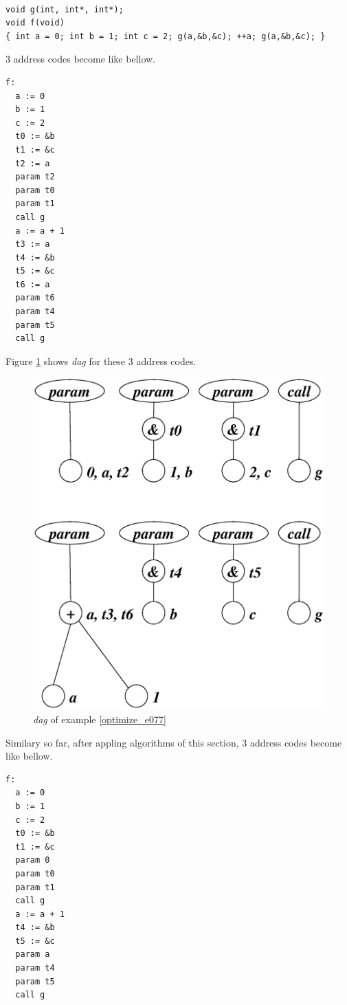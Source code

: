 \begin{Example}
\label{optimize_e077}
\begin{verbatim}

void g(int, int*, int*);
void f(void)
{ int a = 0; int b = 1; int c = 2; g(a,&b,&c); ++a; g(a,&b,&c); }
\end{verbatim}
3 address codes become like bellow.
\begin{verbatim}
f:
  a := 0
  b := 1
  c := 2
  t0 := &b
  t1 := &c
  t2 := a
  param t2
  param t0
  param t1
  call g
  a := a + 1
  t3 := a
  t4 := &b
  t5 := &c
  t6 := a
  param t6
  param t4
  param t5
  call g
\end{verbatim}
Figure \ref{optimize_e078} shows {\em dag} for these 3 address codes.
\begin{figure}[htbp]
\begin{center}
\includegraphics[width=1.0\linewidth,height=0.894\linewidth]{opt032.eps}
\caption{{\em dag} of example \ref{optimize_e077}}
\label{optimize_e078}
\end{center}
\end{figure}
Similary so far,
after appling algorithms of this section,
3 address codes become like bellow.
\begin{verbatim}
f:
  a := 0
  b := 1
  c := 2
  t0 := &b
  t1 := &c
  param 0
  param t0
  param t1
  call g
  a := a + 1
  t4 := &b
  t5 := &c
  param a
  param t4
  param t5
  call g
\end{verbatim}
\end{Example}

